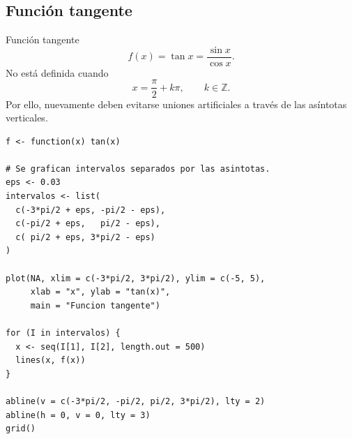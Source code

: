 \documentclass[aspectratio=169,10pt]{beamer}
\begin{document}
\subsection{Función tangente}
\begin{frame}{Función tangente}
\[
f(x)=\tan x=\frac{\sin x}{\cos x}.
\]
No está definida cuando
\[
x=\frac{\pi}{2}+k\pi,\qquad k\in\mathbb Z.
\]
Por ello, nuevamente deben evitarse uniones artificiales a través de las
asíntotas verticales.

\begin{center}
\end{center}

\begin{verbatim}
f <- function(x) tan(x)

# Se grafican intervalos separados por las asintotas.
eps <- 0.03
intervalos <- list(
  c(-3*pi/2 + eps, -pi/2 - eps),
  c(-pi/2 + eps,   pi/2 - eps),
  c( pi/2 + eps, 3*pi/2 - eps)
)

plot(NA, xlim = c(-3*pi/2, 3*pi/2), ylim = c(-5, 5),
     xlab = "x", ylab = "tan(x)",
     main = "Funcion tangente")

for (I in intervalos) {
  x <- seq(I[1], I[2], length.out = 500)
  lines(x, f(x))
}

abline(v = c(-3*pi/2, -pi/2, pi/2, 3*pi/2), lty = 2)
abline(h = 0, v = 0, lty = 3)
grid()
\end{verbatim}

\end{frame}
\end{document}
